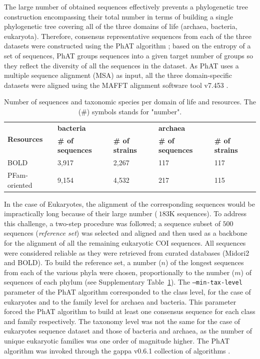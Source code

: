   The large number of obtained sequences effectively prevents a phylogenetic tree construction encompassing their total number in terms of building a single phylogenetic tree covering all of the three domains of life (archaea, bacteria, eukaryota). 
   Therefore, consensus representative sequences from each of the three datasets were constructed using 
   the PhAT algorithm \cite{czech2019methods}; 
   based on the entropy of a set of sequences, PhAT groups sequences into a given target number of groups so they reflect the diversity of all the sequences in the dataset. 
   As PhAT uses a multiple sequence alignment (MSA) as input, all the three domain-specific datasets were aligned using the MAFFT alignment software tool v7.453 \cite{katoh2002mafft, nakamura2018parallelization}.
   
   \begin{table}[h]
      \begin{tabular}{@{}lllll@{}}
      \toprule
      \multirow{2}{*}{\textbf{Resources}} & \multicolumn{2}{l}{\textbf{bacteria}} & \multicolumn{2}{l}{\textbf{archaea}} \\ \cmidrule(l){2-5} 
      & \textbf{\# of sequences} & \textbf{\# of strains} & \textbf{\# of sequences} & \textbf{\# of strains} \\ \cmidrule(r){1-1}
      BOLD & 3,917 & 2,267 & 117 & 117 \\
      PFam-oriented & 9,154 & 4,532 & 217 & 115 \\ \bottomrule
      \end{tabular}
      \caption[Number of sequences and taxonomic species per domain of life and resources]{Number of sequences and taxonomic species per domain of life and resources. The (\#) symbols stands for "number".}
      \label{table:darn-seq-per-domain}
   \end{table}


   In the case of Eukaryotes, the alignment of the corresponding sequences would be impractically long because of their large number ($~183$K sequences). 
   To address this challenge, a two-step procedure was followed; 
   a sequence subset of $500$ sequences (\textit{reference set}) was selected and aligned and then used as a backbone for the alignment of all the remaining eukaryotic COI sequences. 
   All sequences were considered reliable as they were retrieved from curated databases (Midori2 and BOLD). 
   To build the reference set, a number ($n$) of the longest sequences from each of the various phyla were chosen, proportionally to the number ($m$) of sequences of each phylum (see Supplementary Table~\ref{table:darn-seq-per-domain}). 
   The \texttt{--min-tax-level} parameter of the PhAT algorithm corresponded to the class level, for the case of eukaryotes and to the family level for archaea and bacteria. 
   This parameter forced the PhAT algorithm to build at least one consensus sequence for each class and family respectively. 
   The taxonomy level was not the same for the case of eukaryotes sequence dataset and those of bacteria and archaea, as the number of unique eukaryotic families was one order of magnitude higher. 
   The PhAT algorithm was invoked through the gappa v0.6.1 collection of algorithms \cite{czech2020genesis}.


